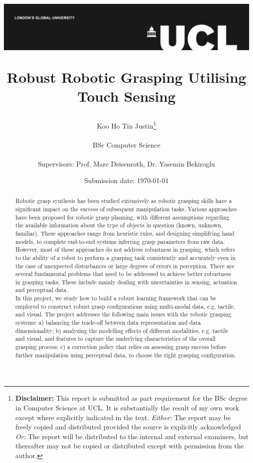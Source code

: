 \documentclass[11pt, a4paper]{report}
\title{{\vspace{-2in}\includegraphics[width=\textwidth]{docs/Project Report/Media/ucl_logo.png}}\\
\vspace{2cm}
\begin{adjustwidth}{1cm}{1cm}
    \centering
    \Huge Robust Robotic Grasping Utilising Touch Sensing
\end{adjustwidth}}
\date{Submission date: \today}
\author{Koo Ho Tin Justin\thanks{
{\bf Disclaimer:}
This report is submitted as part requirement for the BSc degree in Computer Science at UCL. It is
substantially the result of my own work except where explicitly indicated in the text.
\emph{Either:} The report may be freely copied and distributed provided the source is explicitly acknowledged
\newline
\emph{Or:}\newline
The report will be distributed to the internal and external examiners, but thereafter may not be copied or distributed except with permission from the author.}
\\ \\
BSc Computer Science\\ \\
Supervisors: Prof. Marc Deisenroth, Dr. Yasemin Bekiroglu}
\begin{document}
\onehalfspacing
\maketitle
{}

\begin{abstract}
Robotic grasp synthesis has been studied extensively as robotic grasping skills have a significant impact on the success of subsequent manipulation tasks. Various approaches have been proposed for robotic grasp planning, with different assumptions regarding the available information about the type of objects in question (known, unknown, familiar). These approaches range from heuristic rules, and designing simplifying hand models, to complete end-to-end systems inferring grasp parameters from raw data.\\

However, most of these approaches do not address robustness in grasping, which refers to the ability of a robot to perform a grasping task consistently and accurately even in the case of unexpected disturbances or large degrees of errors in perception. There are several fundamental problems that need to be addressed to achieve better robustness in grasping tasks. These include mainly dealing with uncertainties in sensing, actuation and perceptual data.\\

In this project, we study how to build a robust learning framework that can be employed to construct robust grasp configurations using multi-modal data, e.g. tactile, and visual. The project addresses the following main issues with the robotic grasping systems: a) balancing the trade-off between data representation and data dimensionality; b) analyzing the modelling effects of different modalities, e.g. tactile and visual, and features to capture the underlying characteristics of the overall grasping process; c) a correction policy that relies on assessing grasp success before further manipulation using perceptual data, to choose the right grasping configuration.
\end{abstract}


\renewcommand\abstractname{Acknowledgments}
\begin{abstract}
    
\end{abstract}
\end{document}
